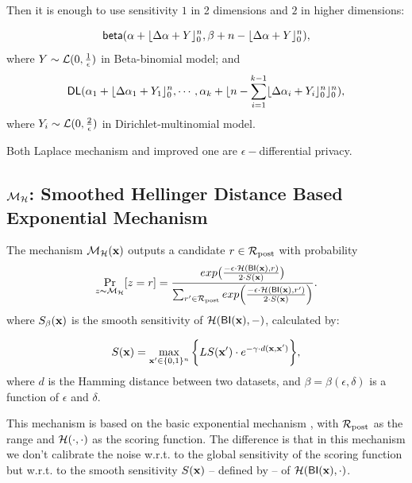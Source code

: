 \documentclass{article}
\begin{document}
 Then it is enough to use sensitivity $1$ in 2 dimensions and $2$ in higher dimensions:

 \[
 \mathsf{beta}(\alpha +  \lfloor{\Delta \alpha + Y}\rfloor^n_0,\beta + n - \lfloor{\Delta \alpha + Y}\rfloor^n_0),
 \]
 where $Y \sim \mathcal{L}(0, \frac{1}{\epsilon})$ in Beta-binomial model; and
 \[
 \mathsf{DL}(\alpha_1 +  \lfloor{\Delta \alpha_1 + Y_1}\rfloor^n_0, \cdots, \alpha_k + \lfloor n - \sum_{i = 1}^{k-1}\lfloor{\Delta \alpha_i + Y_i}\rfloor^n_0 \rfloor^n_0),
 \]
where $Y_i \sim \mathcal{L}(0, \frac{2}{\epsilon})$ in Dirichlet-multinomial model.

Both Laplace mechanism and improved one are $\epsilon -$differential privacy\cite{dwork2014algorithmic}.


\subsection{$\mathcal{M}_{\mathcal{H}}$: Smoothed Hellinger Distance Based Exponential Mechanism}
\label{subsec_hexpmech}

\begin{definition}
\label{def_smoo}
The mechanism $\mathcal{M}_{\mathcal{H}}(\textbf{x})$ outputs a candidate $r \in \mathcal{R}_{\textup{post}}$ with probability
\begin{equation*}
\underset{z \thicksim \mathcal{M}_{\mathcal{H}}}{\Pr}[z=r] = \frac {exp\big(\frac{-\epsilon\cdot\mathcal{H}(\mathsf{BI}(\textbf{x}),r)}{2\cdot S(\textbf{x})}\big)}
{\sum_{r'\in\mathcal{R}_{\textup{post}}} exp\Big(\frac{-\epsilon\cdot\mathcal{H}(\mathsf{BI}(\textbf{x}),r')}{2\cdot S(\textbf{x})}\Big)}.
\end{equation*}
where $S_\beta(\textbf{x})$ is the smooth sensitivity of $\mathcal{H}(\mathsf{BI}(\textbf{x}),-)$, calculated by:

\begin{equation}
  \label{eq:smooth}
   S(\textbf{x})=\max_{\textbf{x}' \in \{0,1\}^{n}}\bigg \{LS(\textbf{x}') \cdot e^{-\gamma\cdot d(\textbf{x},\textbf{x}')}\bigg\},
\end{equation}
where $d$ is the Hamming distance between two datasets, and $\beta =
\beta(\epsilon, \delta)$ is a function of $\epsilon$ and $\delta$. 
\end{definition}

This mechanism is based on the basic exponential mechanism
\cite{talwar}, with $\mathcal{R}_{\textup{post}}$ as the range and
$\mathcal{H}(\cdot,\cdot)$ as the scoring function. The difference is
that in this mechanism we don't calibrate the noise w.r.t. to the
global sensitivity of the scoring function but w.r.t. to the smooth
sensitivity $S(\textbf{x})$ -- defined by \cite{nissim2007smooth}-- of
$\mathcal{H}(\mathsf{BI}(\textbf{x}), \cdot)$.
\end{document}
